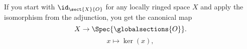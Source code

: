 If you start with $\id_{\sect{X}{O}}$ for any locally ringed space $X$
and apply the isomorphism from the adjunction, you get the canonical map 
\[X \rightarrow \Spec{\globalsections{O}}.\]
\[ x \mapsto \ker(x),\]

